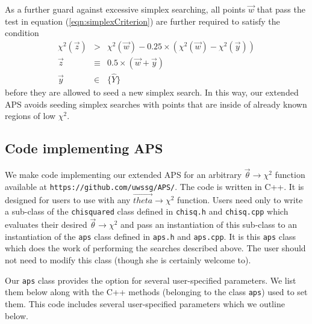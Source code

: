 \documentclass[useAMS,usenatbib]{aastex}
\begin{document}
As a further guard against excessive simplex searching, all points $\vec{w}$ 
that pass the test in equation (\ref{eqn:simplexCriterion}) are further required
to satisfy the condition
\begin{eqnarray}
\chi^2(\vec{z})&>&\chi^2(\vec{w})-0.25\times\left(\chi^2(\vec{w})-\chi^2(\vec{y})\right)\\
\vec{z}&\equiv&0.5\times\left(\vec{w}+\vec{y}\right)\\
\vec{y}&\in&\{\hat{Y}\}
\end{eqnarray}
before they are allowed to seed a new simplex search.  In this way, our 
extended APS avoids seeding simplex
searches with points that are inside of already known regions of low $\chi^2$.

\subsection{Code implementing APS}
\label{sec:user}

We make code implementing our extended APS for 
an arbitrary $\vec{\theta}\rightarrow\chi^2$
function available at \verb|https://github.com/uwssg/APS/|.
The code is written in C++.  It is designed for users to use
with any $\vec{theta}\rightarrow\chi^2$ function.  Users need only
to write a sub-class of the \verb|chisquared| class defined in
\verb|chisq.h| and \verb|chisq.cpp| which evaluates their desired
$\vec{\theta}\rightarrow\chi^2$ and pass an instantiation of this
sub-class to an instantiation of the \verb|aps| class defined in
\verb|aps.h| and \verb|aps.cpp|.  It is this \verb|aps| class which
does the work of performing the searches described above.
The user should not need to modify this class (though she is 
certainly welcome to).

Our \verb|aps| class provides the option for several
user-specified parameters.  We list them below along with the C++ 
methods (belonging to the class \verb|aps|) used to set them.  
This code includes several user-specified parameters which we
outline below.
\end{document}
